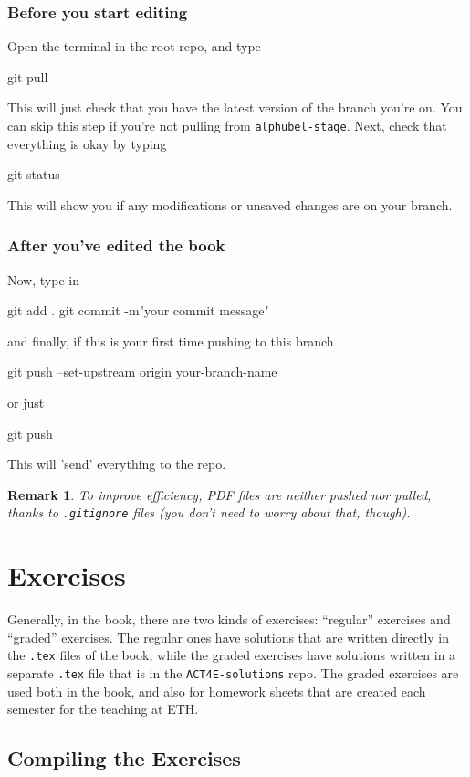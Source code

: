 \documentclass{article}
\newtheorem{remark}{Remark}
\begin{document}
\subsubsection{Before you start editing}
Open the terminal in the root repo, and type 
\begin{bashcode}
    git pull 
\end{bashcode}
This will just check that you have the latest version of the branch you're on. You can skip this step if you're not pulling from \texttt{alphubel-stage}. Next, check that everything is okay by typing
\begin{bashcode}
    git status
\end{bashcode} 
This will show you if any modifications or unsaved changes are on your branch.
\subsubsection{After you've edited the book}
Now, type in
\begin{bashcode}
    git add .
    git commit -m"your commit message"
\end{bashcode}
and finally, if this is your first time pushing to this branch
\begin{bashcode}
    git push --set-upstream origin your-branch-name
\end{bashcode}
or just 
\begin{bashcode}
    git push
\end{bashcode}
This will 'send' everything to the repo.
\begin{remark}
    To improve efficiency, PDF files are neither pushed nor pulled, thanks to \texttt{.gitignore} files (you don't need to worry about that, though).
\end{remark}

\section{Exercises}
Generally, in the book, there are two kinds of exercises: “regular” exercises and “graded” exercises. The regular ones have solutions that are written directly in the \texttt{.tex} files of the book, while the graded exercises have solutions written in a separate \texttt{.tex} file that is in the \texttt{ACT4E-solutions} repo. The graded exercises are used both in the book, and also for homework sheets that are created each semester for the teaching at ETH.

\subsection{Compiling the Exercises}
\end{document}
